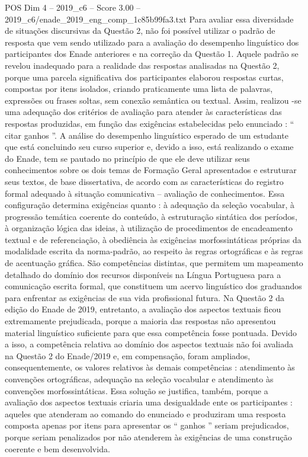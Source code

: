 \begin{textsample}{POS Dim 4 – 2019\_c6 – Score 3.00 – 2019\_c6/enade\_2019\_eng\_comp\_1c85b99fa3.txt}
Para avaliar essa diversidade de situações discursivas da Questão 2, não foi possível utilizar o padrão de resposta que vem sendo utilizado para a avaliação do desempenho linguístico dos participantes dos Enade anteriores e na correção da Questão 1.
Aquele padrão se revelou inadequado para a realidade das respostas analisadas na Questão 2, porque uma parcela significativa dos participantes elaborou respostas curtas, compostas por itens isolados, criando praticamente uma lista de palavras, expressões ou frases soltas, sem conexão semântica ou textual.
Assim, realizou -se uma adequação dos critérios de avaliação para atender às características das respostas produzidas, em função das exigências estabelecidas pelo enunciado : “ citar ganhos ”.
A análise do desempenho linguístico esperado de um estudante que está concluindo seu curso superior e, devido a isso, está realizando o exame do Enade, tem se pautado no princípio de que ele deve utilizar seus conhecimentos sobre os dois temas de Formação Geral apresentados e estruturar seus textos, de base dissertativa, de acordo com as características do registro formal adequado à situação comunicativa – avaliação de conhecimentos.
Essa configuração determina exigências quanto : à adequação da seleção vocabular, à progressão temática coerente do conteúdo, à estruturação sintática dos períodos, à organização lógica das ideias, à utilização de procedimentos de encadeamento textual e de referenciação, à obediência às exigências morfossintáticas próprias da modalidade escrita da norma-padrão, ao respeito às regras ortográficas e às regras de acentuação gráfica.
São competências distintas, que permitem um mapeamento detalhado do domínio dos recursos disponíveis na Língua Portuguesa para a comunicação escrita formal, que constituem um acervo linguístico dos graduandos para enfrentar as exigências de sua vida profissional futura.
Na Questão 2 da edição do Enade de 2019, entretanto, a avaliação dos aspectos textuais ficou extremamente prejudicada, porque a maioria das respostas não apresentou material linguístico suficiente para que essa competência fosse pontuada.
Devido a isso, a competência relativa ao domínio dos aspectos textuais não foi avaliada na Questão 2 do Enade/2019 e, em compensação, foram ampliados, consequentemente, os valores relativos às demais competências : atendimento às convenções ortográficas, adequação na seleção vocabular e atendimento às convenções morfossintáticas.
Essa solução se justifica, também, porque a avaliação dos aspectos textuais criaria uma desigualdade ente os participantes : aqueles que atenderam ao comando do enunciado e produziram uma resposta composta apenas por itens para apresentar os “ ganhos ” seriam prejudicados, porque seriam penalizados por não atenderem às exigências de uma construção coerente e bem desenvolvida.

\end{textsample}
